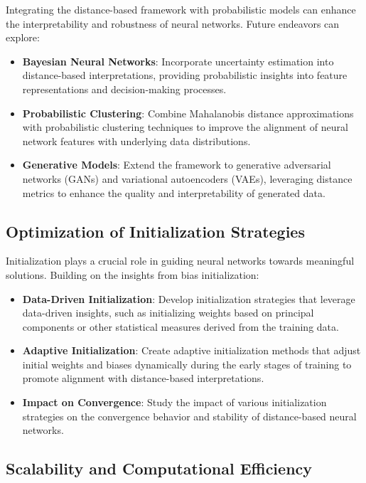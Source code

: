 Integrating the distance-based framework with probabilistic models can enhance the interpretability and robustness of neural networks. Future endeavors can explore:
\begin{itemize}
    \item \textbf{Bayesian Neural Networks}: Incorporate uncertainty estimation into distance-based interpretations, providing probabilistic insights into feature representations and decision-making processes.
    \item \textbf{Probabilistic Clustering}: Combine Mahalanobis distance approximations with probabilistic clustering techniques to improve the alignment of neural network features with underlying data distributions.
    \item \textbf{Generative Models}: Extend the framework to generative adversarial networks (GANs) and variational autoencoders (VAEs), leveraging distance metrics to enhance the quality and interpretability of generated data.
\end{itemize}

\subsection{Optimization of Initialization Strategies}

Initialization plays a crucial role in guiding neural networks towards meaningful solutions. Building on the insights from bias initialization:
\begin{itemize}
    \item \textbf{Data-Driven Initialization}: Develop initialization strategies that leverage data-driven insights, such as initializing weights based on principal components or other statistical measures derived from the training data.
    \item \textbf{Adaptive Initialization}: Create adaptive initialization methods that adjust initial weights and biases dynamically during the early stages of training to promote alignment with distance-based interpretations.
    \item \textbf{Impact on Convergence}: Study the impact of various initialization strategies on the convergence behavior and stability of distance-based neural networks.
\end{itemize}

\subsection{Scalability and Computational Efficiency}

